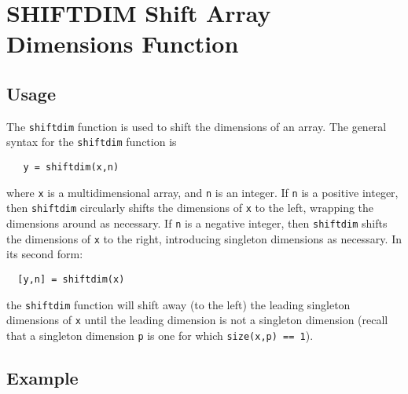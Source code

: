 \section{SHIFTDIM Shift Array Dimensions Function}

\subsection{Usage}

The \verb|shiftdim| function is used to shift the dimensions of an array.
The general syntax for the \verb|shiftdim| function is
\begin{verbatim}
   y = shiftdim(x,n)
\end{verbatim}
where \verb|x| is a multidimensional array, and \verb|n| is an integer.  If
\verb|n| is a positive integer, then \verb|shiftdim| circularly shifts the 
dimensions of \verb|x| to the left, wrapping the dimensions around as 
necessary.  If \verb|n| is a negative integer, then \verb|shiftdim| shifts
the dimensions of \verb|x| to the right, introducing singleton dimensions
as necessary.  In its second form:
\begin{verbatim}
  [y,n] = shiftdim(x)
\end{verbatim}
the \verb|shiftdim| function will shift away (to the left) the leading
singleton dimensions of \verb|x| until the leading dimension is not
 a singleton dimension (recall that a singleton dimension \verb|p| is one for
which \verb|size(x,p) == 1|).
\subsection{Example}

